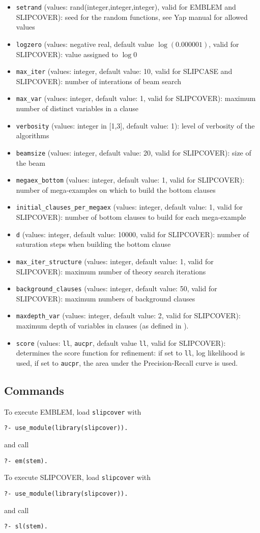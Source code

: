 \documentclass[a4paper,10pt]{article}
\begin{document}
\begin{itemize}
\item \verb|setrand| (values: rand(integer,integer,integer), valid for EMBLEM and SLIPCOVER): seed for the random functions, see Yap manual for allowed values
\item \verb|logzero| (values: negative real, default value $\log(0.000001)$, valid for SLIPCOVER): value assigned to $\log 0$
\item \verb|max_iter| (values: integer, default value: 10, valid for SLIPCASE and SLIPCOVER): number of interations of beam search
\item \verb|max_var| (values: integer, default value: 1, valid for 
SLIPCOVER): maximum number of distinct variables in a clause
\item \verb|verbosity| (values: integer in [1,3], default value: 1): level of verbosity of the algorithms
\item \verb|beamsize|  (values: integer, default value: 20, valid for SLIPCOVER): size of the beam 
\item \verb|megaex_bottom| (values: integer, default value: 1, valid for SLIPCOVER): number of mega-examples on which to build the bottom clauses
\item \verb|initial_clauses_per_megaex| (values: integer, default value: 1, valid for SLIPCOVER): 
 number of bottom clauses to build for each mega-example
\item \verb|d| (values: integer, default value: 10000, valid for SLIPCOVER): 
 number of saturation steps when building the bottom clause
\item \verb|max_iter_structure| (values: integer, default value: 1, valid for SLIPCOVER): 
maximum  number of theory search iterations
\item \verb|background_clauses| (values: integer, default value: 50, valid for SLIPCOVER): 
 maximum numbers of background clauses
\item \verb|maxdepth_var| (values: integer, default value: 2, valid for SLIPCOVER): maximum depth of
variables in clauses (as defined in \cite{DBLP:journals/ai/Cohen95}).
\item \verb|score| (values: \verb|ll|, \verb|aucpr|, default value \verb|ll|, valid for SLIPCOVER): determines the score function for refinement: if set to \verb|ll|, log likelihood is used, if set to \verb|aucpr|, the area under the 
Precision-Recall curve is used. 
\end{itemize}
\subsection{Commands}
To execute EMBLEM, load \texttt{slipcover} with
\begin{verbatim}
?- use_module(library(slipcover)).
\end{verbatim}
and call
\begin{verbatim}
?- em(stem).
\end{verbatim}
To execute SLIPCOVER, load \texttt{slipcover} with
\begin{verbatim}
?- use_module(library(slipcover)).
\end{verbatim}
and call
\begin{verbatim}
?- sl(stem).
\end{verbatim}
\end{document}
